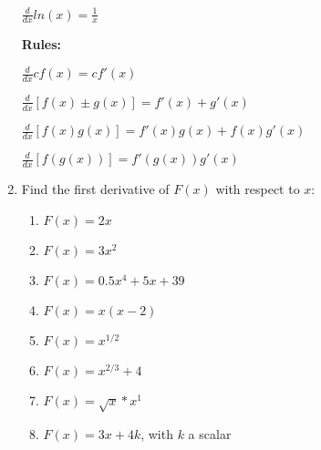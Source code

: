 \documentclass[11pt]{article}
\begin{document}
\begin{enumerate}
\begin{tcolorbox}[title= {\bf Helpful Derivative Formulae:}]
\begin{multicols}{2}
        \vspace{5mm}
        $\frac{d}{dx} ln(x) = \frac{1}{x}$ 


        \columnbreak

        {\bf Rules:}

        \vspace{5mm}
        $\frac{d}{dx} cf(x) = cf'(x)$

        \vspace{5mm}
        $\frac{d}{dx} [f(x) \pm g(x)] = f'(x) + g'(x)$

        \vspace{5mm}
        $\frac{d}{dx} [f(x) g(x)] = f'(x)g(x) + f(x)g'(x)$

        \vspace{5mm}
        $\frac{d}{dx} [f(g(x))] = f'(g(x)) g'(x)$
    \end{multicols}
    \vspace{-2mm}
  \end{tcolorbox}

  \item Find the first derivative of $F(x)$ with respect to $x$:
  \begin{multicols}{2}
    \begin{enumerate}
      \item $F(x) = 2x$
      
      \vspace{25mm}
      \item $F(x) = 3x^2$
      
      \vspace{25mm}
      \item $F(x) = 0.5x^4 + 5x + 39$
      
      \vspace{25mm}
      \item $F(x) = x(x-2)$
      
      \vspace{25mm}
      \item $F(x) = x^{1/2}$
      
      \vspace{25mm}
      \item $F(x) = x^{2/3} + 4$
      
      \vspace{25mm}
      \item $F(x) = \sqrt{x} * x^1$
      
      \vspace{25mm}
      \item $F(x) = 3x + 4k$, with $k$ a scalar
    \end{enumerate}
  \end{multicols}



\end{enumerate}
\end{document}
